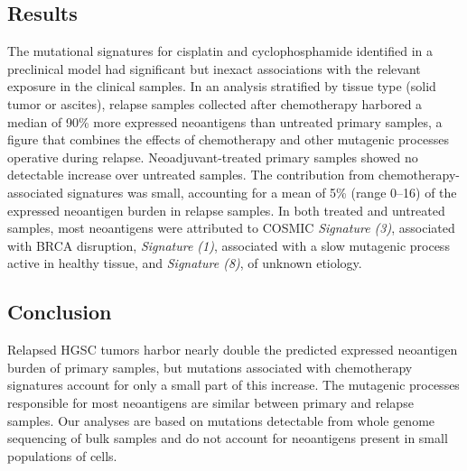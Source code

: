 \subsection*{Results}
The mutational signatures for cisplatin and cyclophosphamide identified in a preclinical model had significant but inexact associations with the relevant exposure in the clinical samples. In an analysis stratified by tissue type (solid tumor or ascites), relapse samples collected after chemotherapy harbored a median of 90\% more expressed neoantigens than untreated primary samples, a figure that combines the effects of chemotherapy and other mutagenic processes operative during relapse. Neoadjuvant-treated primary samples showed no detectable increase over untreated samples. The contribution from chemotherapy-associated signatures was small, accounting for a mean of 5\% (range 0--16) of the expressed neoantigen burden in relapse samples. In both treated and untreated samples, most neoantigens were attributed to COSMIC \textit{Signature (3)}, associated with BRCA disruption, \textit{Signature (1)}, associated with a slow mutagenic process active in healthy tissue, and \textit{Signature (8)}, of unknown etiology.

\subsection*{Conclusion}
Relapsed HGSC tumors harbor nearly double the predicted expressed neoantigen burden of primary samples, but mutations associated with chemotherapy signatures account for only a small part of this increase. The mutagenic processes responsible for most neoantigens are similar between primary and relapse samples. Our analyses are based on mutations detectable from whole genome sequencing of bulk samples and do not account for neoantigens present in small populations of cells. 



